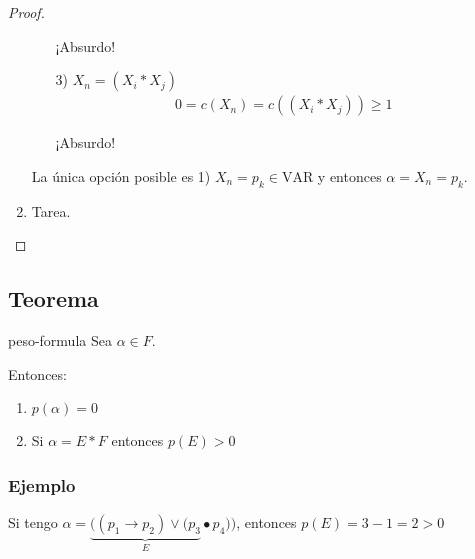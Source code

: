 \begin{proof}
\begin{enumerate}
\begin{enumerate}
                    ¡Absurdo!

                \item[3)] $X_n = (X_i * X_j)$ %
                    \begin{gather*}
                        0 = c(X_n) = c((X_i * X_j)) \geq 1
                    \end{gather*}

                    ¡Absurdo!
            \end{enumerate}

            La única opción posible es 1) $X_n = p_k \in \mathrm{VAR}$ y
            entonces $\alpha = X_n = p_k$.

        \item Tarea.
    \end{enumerate}
\end{proof}

\subsection{Teorema}

\begin{teorema}{}{peso-formula}
    Sea $\alpha \in F$.

    \medskip

    Entonces:
    \begin{enumerate}
        \item $p(\alpha)= 0$
        \item Si $\alpha = E * F$ entonces $p(E)>0$
            \nota{$* \in \{ \wedge, \vee, \to \}$}%
    \end{enumerate}
\end{teorema}

\subsubsection{Ejemplo}

Si tengo $\alpha = \underbrace{((p_1 \to p_2) \vee (p_3}_{E} \bullet p_4))$, 
entonces $p(E) = 3-1 = 2>0$



